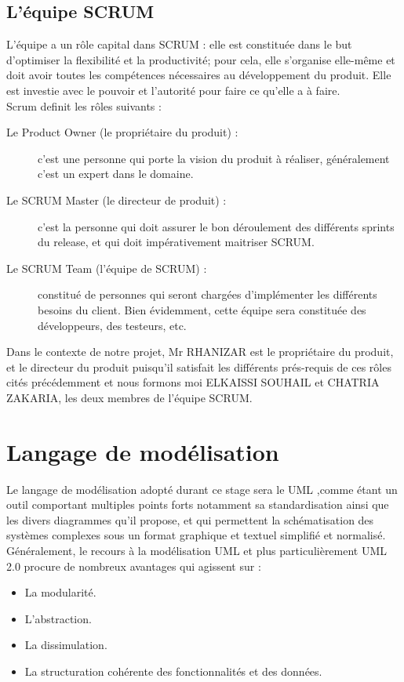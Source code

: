 \subsection{L'équipe SCRUM}
L’équipe a un rôle capital dans SCRUM : elle est constituée dans le but d’optimiser la flexibilité et la productivité; pour cela, elle s’organise elle-même et doit avoir toutes les compétences nécessaires au développement du produit. Elle est investie avec le pouvoir et l’autorité pour faire ce qu’elle a à faire.\\[0.5cm]
Scrum definit les rôles suivants :
\begin{description}
\item[Le Product Owner (le propriétaire du produit) : ] c’est une personne qui porte la vision du produit à réaliser, généralement c’est un expert dans le domaine.
\item[Le SCRUM Master (le directeur de produit) : ]c'est la personne qui doit assurer le bon déroulement des différents sprints du release, et qui doit impérativement maitriser SCRUM. 
\item[Le SCRUM Team (l’équipe de SCRUM) : ] constitué de personnes qui seront chargées d’implémenter les différents besoins du client. Bien évidemment, cette équipe sera constituée des développeurs, des testeurs, etc.
\end{description}
Dans le contexte de notre projet, Mr RHANIZAR est  le propriétaire du produit, et le directeur du produit puisqu’il satisfait les différents prés-requis de ces rôles cités précédemment et nous formons moi ELKAISSI SOUHAIL et CHATRIA ZAKARIA, les deux membres de l’équipe SCRUM. 
\section{Langage de modélisation}
Le langage de modélisation adopté durant ce stage sera le UML ,comme étant un outil comportant multiples points forts notamment sa standardisation ainsi que les divers diagrammes qu’il propose, et qui permettent la schématisation des systèmes complexes sous un format graphique et textuel simplifié et normalisé.\\
Généralement, le recours à la modélisation UML et plus particulièrement UML 2.0 procure de nombreux avantages qui agissent sur :
\begin{itemize}
\item La modularité.
\item L’abstraction.
\item La dissimulation.
\item La structuration cohérente des fonctionnalités et des données.
\end{itemize}
